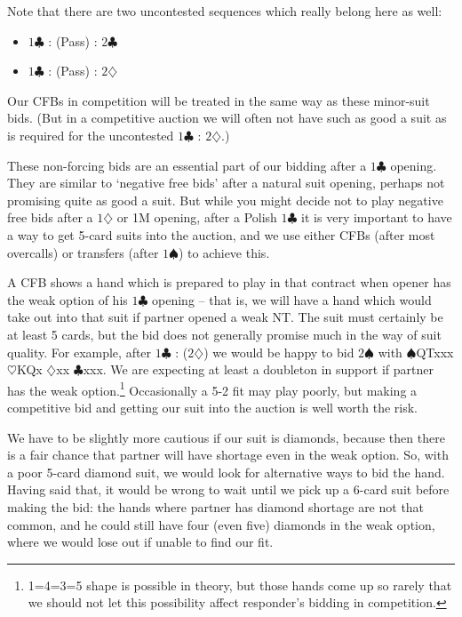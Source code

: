 \documentclass{article}
\newcommand{\sz}{\spadesuit}
\newcommand{\hz}{\heartsuit}
\newcommand{\dz}{\diamondsuit}
\newcommand{\cz}{\clubsuit}
\begin{document}
Note that there are two uncontested sequences which really belong here as well:

\begin{itemize}
\item $1\cz$ : (Pass) : $2\cz$
\item $1\cz$ : (Pass) : $2\dz$
\end{itemize}
Our CFBs in competition will be treated in the same way as these minor-suit bids. (But in a competitive auction we will often not have such as good a suit as is required for the uncontested $1\cz$ : $2\dz$.)

\vspace{4mm}
These non-forcing bids are an essential part of our bidding after a $1\cz$ opening. They are similar to `negative free bids' after a natural suit opening, perhaps not promising quite as good a suit. But while you might decide not to play negative free bids after a $1\dz$ or 1M opening, after a Polish $1\cz$ it is very important to have a way to get 5-card suits into the auction, and we use either CFBs (after most overcalls) or transfers (after $1\sz$) to achieve this.

A CFB shows a hand which is prepared to play in that contract when opener has the weak option of his $1\cz$ opening -- that is, we will have a hand which would take out into that suit if partner opened a weak NT. The suit must certainly be at least 5 cards, but the bid does not generally promise much in the way of suit quality. For example, after $1\cz$ : ($2\dz$) we would be happy to bid $2\sz$ with $\sz$QTxxx $\hz$KQx $\dz$xx $\cz$xxx. We are expecting at least a doubleton in support if partner has the weak option.\footnote{1=4=3=5 shape is possible in theory, but those hands come up so rarely that we should not let this possibility affect responder's bidding in competition.} Occasionally a 5-2 fit may play poorly, but making a competitive bid and getting our suit into the auction is well worth the risk.

We have to be slightly more cautious if our suit is diamonds, because then there is a fair chance that partner will have shortage even in the weak option. So, with a poor 5-card diamond suit, we would look for alternative ways to bid the hand. Having said that, it would be wrong to wait until we pick up a 6-card suit before making the bid: the hands where partner has diamond shortage are not that common, and he could still have four (even five) diamonds in the weak option, where we would lose out if unable to find our fit.
\end{document}
